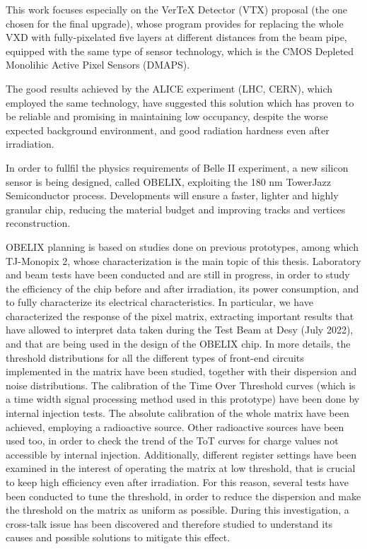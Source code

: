 \documentclass[10pt,a4paper,twoside]{report}
\begin{document}
This work focuses especially on the VerTeX Detector (VTX) proposal (the one chosen for the final upgrade), whose program provides for replacing the whole VXD with fully-pixelated five layers at different distances from the beam pipe, equipped with the same type of sensor technology, which is the CMOS Depleted Monolihic Active Pixel Sensors (DMAPS). 

The good results achieved by the ALICE experiment (LHC, CERN), which employed the same technology, have suggested this solution which has proven to be reliable and promising in maintaining low occupancy, despite the worse expected background environment, and good radiation hardness even after irradiation. 

In order to fullfil the physics requirements of Belle II experiment, a new silicon sensor is being designed, called OBELIX, exploiting the 180 nm TowerJazz Semiconductor process. Developments will ensure a faster, lighter and highly granular chip, reducing the material budget and improving tracks and vertices reconstruction. 

OBELIX planning is based on studies done on previous prototypes, among which TJ-Monopix 2, whose characterization is the main topic of this thesis. Laboratory and beam tests have been conducted and are still in progress, in order to study the efficiency of the chip before and after irradiation, its power consumption, and to fully characterize its electrical characteristics. 
In particular, we have characterized the response of the pixel matrix, extracting important results that have allowed to interpret data taken during the Test Beam at Desy (July 2022), and that are being used in the design of the OBELIX chip. 
In more details, the threshold distributions for all the different types of front-end circuits implemented in the matrix have been studied, together with their dispersion and noise distributions. 
The calibration of the Time Over Threshold curves (which is a time width signal processing method used in this prototype) have been done by internal injection tests. The absolute calibration of the whole matrix have been achieved, employing a  radioactive source. Other radioactive sources have been used too, in order to check the trend of the ToT curves for charge values not accessible by internal injection. 
Additionally, different register settings have been examined in the interest of operating the matrix at low threshold, that is crucial to keep high efficiency even after irradiation. For this reason, several tests have been conducted to tune the threshold, in order to reduce the dispersion and make the threshold on the matrix as uniform as possible.
During this investigation, a cross-talk issue has been discovered and therefore studied to understand its causes and possible solutions to mitigate this effect.
\end{document}
